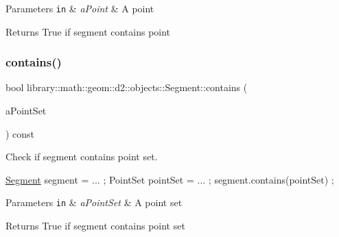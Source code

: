 \begin{DoxyParams}[1]{Parameters}
\mbox{\tt in}  & {\em a\+Point} & A point \\
\hline
\end{DoxyParams}
\begin{DoxyReturn}{Returns}
True if segment contains point 
\end{DoxyReturn}
\mbox{\label{classlibrary_1_1math_1_1geom_1_1d2_1_1objects_1_1_segment_a501ffbc0492c4b9e279bba7b7a79ae89}} 
\subsubsection{\texorpdfstring{contains()}{contains()}\hspace{0.1cm}{\footnotesize\ttfamily [2/2]}}
{\footnotesize\ttfamily bool library\+::math\+::geom\+::d2\+::objects\+::\+Segment\+::contains (\begin{DoxyParamCaption}\item[{const \hyperlink{classlibrary_1_1math_1_1geom_1_1d2_1_1objects_1_1_point_set}{Point\+Set} \&}]{a\+Point\+Set }\end{DoxyParamCaption}) const}



Check if segment contains point set. 


\begin{DoxyCode}
\hyperlink{classlibrary_1_1math_1_1geom_1_1d2_1_1objects_1_1_segment_a44ba44fd5f02a02fe34c40223b38fa8f}{Segment} segment = ... ;
PointSet pointSet = ... ;
segment.contains(pointSet) ;
\end{DoxyCode}



\begin{DoxyParams}[1]{Parameters}
\mbox{\tt in}  & {\em a\+Point\+Set} & A point set \\
\hline
\end{DoxyParams}
\begin{DoxyReturn}{Returns}
True if segment contains point set 
\end{DoxyReturn}
\mbox{\label{classlibrary_1_1math_1_1geom_1_1d2_1_1objects_1_1_segment_a964684b33e11314a0b818fb089a197e6}} 
